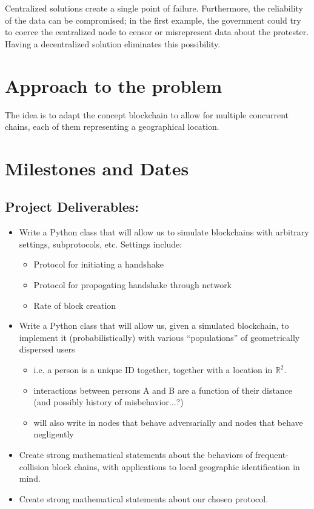 \documentclass{article}
\begin{document}
Centralized solutions create a single point of failure.
Furthermore,
the reliability of the data can be compromised;
in the first example,
the government could try to coerce the centralized node
to censor or misrepresent data about the protester.
Having a decentralized solution eliminates this possibility.


\section*{Approach to the problem}

The idea is to adapt the concept blockchain to allow for multiple concurrent chains,
each of them representing a geographical location.


\section*{Milestones and Dates}
\subsection*{Project Deliverables:}
\begin{itemize}
	\item Write a Python class that will allow us to simulate
		blockchains with arbitrary settings, subprotocols, etc.
		Settings include:
	\begin{itemize}
		\item Protocol for initiating a handshake
		\item Protocol for propogating handshake through network
		\item Rate of block creation
	\end{itemize}
	\item Write a Python class that will allow us, given a simulated
		blockchain, to implement it (probabilistically) with
		various ``populations'' of geometrically dispersed users
	\begin{itemize}
		\item i.e. a person is a unique ID together,
			together with a location in $\mathbb{R}^2$.
		\item interactions between persons A and B are
			a function of their distance (and possibly
			history of misbehavior...?)
		\item will also write in nodes that behave adversarially
			and nodes that behave negligently
	\end{itemize}
	\item Create strong mathematical statements about
		the behaviors of frequent-collision block chains,
		with applications to local geographic identification
		in mind.
	\item Create strong mathematical statements about our chosen
		protocol.
\end{itemize}
\end{document}

